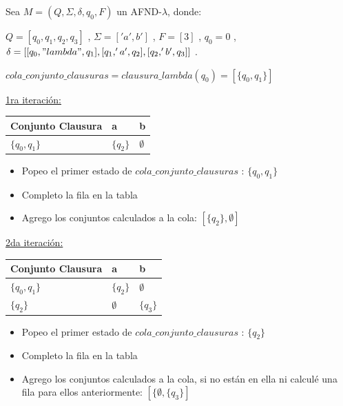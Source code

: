 Sea $M = (Q,\Sigma, \delta, q_{0}, F)$ un AFND-$\lambda$, donde:

$Q = [q_{0},q_{1},q_{2},q_{3}]$ ,
$\Sigma = ['a',b']$ ,
$F = [3]$ ,
$q_{0} = 0$ ,
$\delta = [[q_{0},"lambda",q_{1}],[q_{1},'a',q_{2}],[q_{2},'b',q_{3}]]$ .

\vspace{2 mm}
$cola\_conjunto\_clausuras = clausura\_lambda(q_{0}) = [\{q_{0},q_{1}\}]$

\vspace{5mm}

\underline{1ra iteración:}

\vspace{1 mm}

\begin{tabular}{ | l | l | l |}
  \hline
  Conjunto Clausura & a & b \\ \hline
  $\{q_{0},q_{1}\}$ & $\{q_{2}\}$ & $\emptyset$ \\ \hline
\end{tabular}

\begin{itemize}
  \item Popeo el primer estado de $cola\_conjunto\_clausuras$ : $\{q_{0},q_{1}\}$
  \item Completo la fila en la tabla
  \item Agrego los conjuntos calculados a la cola: $[\{q_{2}\}, \emptyset]$
\end{itemize}


\vspace{2mm}

\underline{2da iteración:}

\vspace{1 mm}

\begin{tabular}{ | l | l | l |}
  \hline
  Conjunto Clausura & a & b \\ \hline
  $\{q_{0},q_{1}\}$ & $\{q_{2}\}$ & $\emptyset$ \\ \hline
  $\{q_{2}\}$ & $\emptyset$ & $\{q_{3}\}$ \\ \hline
\end{tabular}

\begin{itemize}
  \item Popeo el primer estado de $cola\_conjunto\_clausuras$ : $\{q_{2}\}$
  \item Completo la fila en la tabla
  \item Agrego los conjuntos calculados a la cola, si no están en ella ni calculé una fila para ellos anteriormente: $[\{\emptyset, \{q_{3}\}]$
\end{itemize}

